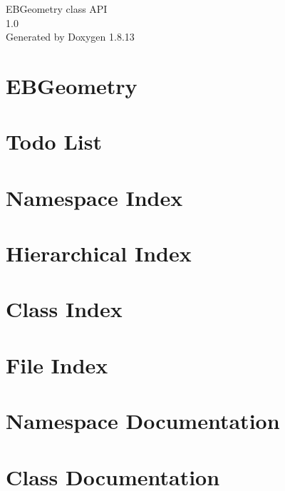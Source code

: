 \documentclass[twoside]{book}
\newcommand{\+}{\discretionary{\mbox{\scriptsize$\hookleftarrow$}}{}{}}
\newcommand{\clearemptydoublepage}{%
  \newpage{\pagestyle{empty}\cleardoublepage}%
}
\begin{document}
\hypersetup{pageanchor=false,
             bookmarksnumbered=true,
             pdfencoding=unicode
            }
\begin{titlepage}
\vspace*{7cm}
\begin{center}%
{\Large E\+B\+Geometry class A\+PI \\[1ex]\large 1.\+0 }\\
\vspace*{1cm}
{\large Generated by Doxygen 1.8.13}\\
\end{center}
\end{titlepage}
\clearemptydoublepage
{}
\tableofcontents
\clearemptydoublepage
{}
\hypersetup{pageanchor=true}

\chapter{E\+B\+Geometry}
\label{index}\hypertarget{index}{}
\chapter{Todo List}
\label{todo}

\chapter{Namespace Index}

\chapter{Hierarchical Index}

\chapter{Class Index}

\chapter{File Index}

\chapter{Namespace Documentation}




\chapter{Class Documentation}






















\end{document}
